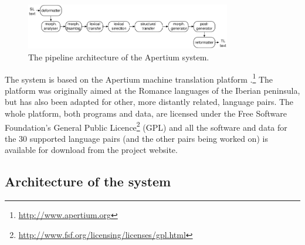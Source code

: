 \documentclass[11pt]{article}
\begin{document}
\begin{figure}[htbp]
\begin{center}
 \includegraphics[width=0.8\textwidth]{architecture.pdf}
\end{center}
\caption{The pipeline architecture of the Apertium system.}
\label{fig:modules}
\end{figure}

The system is based on the Apertium machine translation 
platform \citep{apertium/2011}.\footnote{\url{http://www.apertium.org}} The 
platform was originally aimed at the Romance languages of the Iberian peninsula, but has also been adapted for 
other, more distantly related, language pairs.
The whole platform, both programs and data, are licensed under the Free Software Foundation's General Public 
Licence\footnote{\url{http://www.fsf.org/licensing/licenses/gpl.html}} (GPL) and all the software and data for the 
30 supported language pairs (and the other pairs being worked on) is available for download from the project 
website.

\subsection{Architecture of the system}
\end{document}
